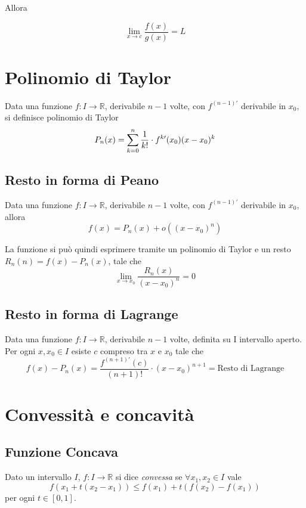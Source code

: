Allora

$$\lim_{x \to c}{\frac{f(x)}{g(x)}} = L$$

\section{Polinomio di Taylor}

Data una funzione $f: I\to \mathbb{R}$, derivabile $n-1$ volte, con $f^{(n-1)\prime}$ derivabile in $x_0$, si definisce polinomio di Taylor $$P_n(x)=\sum\limits_{k=0}^{n}\frac{1}{k!}\cdot f^{k\prime}(x_0)(x-x_0)^k$$


\subsection{Resto in forma di Peano}

Data una funzione $f: I\to \mathbb{R}$, derivabile $n-1$ volte, con $f^{(n-1)\prime}$ derivabile in $x_0$, allora $$f(x)=P_n(x)+o((x-x_0)^n)$$

La funzione si può quindi esprimere tramite un polinomio di Taylor e un resto $R_n(n)=f(x)-P_n(x)$, tale che $$\lim_{x\to x_0} \frac{R_n(x)}{(x-x_0)^n}=0$$

\subsection{Resto in forma di Lagrange}

Data una funzione $f: I\to \mathbb{R}$, derivabile $n-1$ volte, definita su I intervallo aperto. Per ogni $x,x_0 \in I$ esiste $c$ compreso tra $x$ e $x_0$ tale che $$f(x)-P_n(x)=\frac{f^{(n+1)\prime}(c)}{(n+1)!}\cdot (x-x_0)^{n+1} = \text{Resto di Lagrange}$$ 

\section{Convessità e concavità}

\subsection{Funzione Concava}
Dato un intervallo $I$, $f: I \to \mathbb{R}$ si dice \emph{convessa} se $\forall x_1, x_2 \in I$ vale
\begin{equation*}
f(x_1 + t(x_2-x_1)) \le f(x_1) + t(f(x_2)-f(x_1))
\end{equation*}
per ogni $t \in [0,1]$.

\begin{center}
\end{center}

